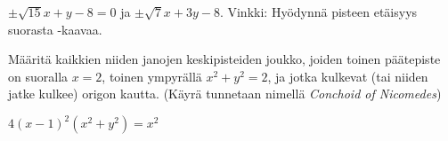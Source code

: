 \begin{tehtavasivu}
\begin{tehtava}
\begin{vastaus}
$\pm\sqrt{15}x+y-8= 0$ ja $\pm\sqrt{7}x+3y-8$. Vinkki: Hyödynnä pisteen etäisyys suorasta -kaavaa.
\end{vastaus}
\end{tehtava}

\begin{tehtava}
Määritä kaikkien niiden janojen keskipisteiden joukko, joiden toinen päätepiste on suoralla $x = 2$, toinen ympyrällä $x^2+y^2 = 2$, ja jotka kulkevat (tai niiden jatke kulkee) origon kautta. (Käyrä tunnetaan nimellä \textit{Conchoid of Nicomedes})
	\begin{vastaus}
		$4(x-1)^2(x^2+y^2) = x^2$
	\end{vastaus}
	
\end{tehtava}

\end{tehtavasivu}
